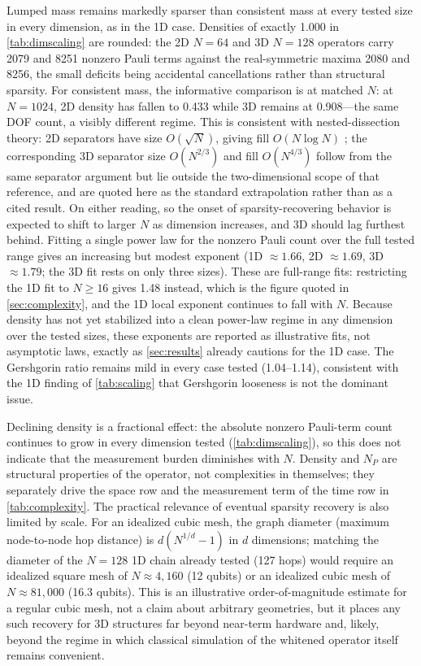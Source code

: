 \documentclass{ieeeaccess}
\begin{document}
Lumped mass remains markedly sparser than consistent mass at every tested size in every dimension, as in the 1D case. Densities of exactly 1.000 in \cref{tab:dimscaling} are rounded: the 2D $N=64$ and 3D $N=128$ operators carry 2079 and 8251 nonzero Pauli terms against the real-symmetric maxima 2080 and 8256, the small deficits being accidental cancellations rather than structural sparsity. For consistent mass, the informative comparison is at matched $N$: at $N=1024$, 2D density has fallen to 0.433 while 3D remains at 0.908---the same DOF count, a visibly different regime. This is consistent with nested-dissection theory: 2D separators have size $O(\sqrt N)$, giving fill $O(N\log N)$ \cite{GeorgeNg1988}; the corresponding 3D separator size $O(N^{2/3})$ and fill $O(N^{4/3})$ follow from the same separator argument but lie outside the two-dimensional scope of that reference, and are quoted here as the standard extrapolation rather than as a cited result. On either reading, so the onset of sparsity-recovering behavior is expected to shift to larger $N$ as dimension increases, and 3D should lag furthest behind. Fitting a single power law for the nonzero Pauli count over the full tested range gives an increasing but modest exponent (1D $\approx\!1.66$, 2D $\approx\!1.69$, 3D $\approx\!1.79$; the 3D fit rests on only three sizes). These are full-range fits: restricting the 1D fit to $N\ge16$ gives 1.48 instead, which is the figure quoted in \cref{sec:complexity}, and the 1D local exponent continues to fall with $N$. Because density has not yet stabilized into a clean power-law regime in any dimension over the tested sizes, these exponents are reported as illustrative fits, not asymptotic laws, exactly as \cref{sec:results} already cautions for the 1D case. The Gershgorin ratio remains mild in every case tested (1.04--1.14), consistent with the 1D finding of \cref{tab:scaling} that Gershgorin looseness is not the dominant issue.

Declining density is a fractional effect: the absolute nonzero Pauli-term count continues to grow in every dimension tested (\cref{tab:dimscaling}), so this does not indicate that the measurement burden diminishes with $N$. Density and $N_P$ are structural properties of the operator, not complexities in themselves; they separately drive the space row and the measurement term of the time row in \cref{tab:complexity}. The practical relevance of eventual sparsity recovery is also limited by scale. For an idealized cubic mesh, the graph diameter (maximum node-to-node hop distance) is $d(N^{1/d}-1)$ in $d$ dimensions; matching the diameter of the $N=128$ 1D chain already tested (127 hops) would require an idealized square mesh of $N\approx4{,}160$ (12 qubits) or an idealized cubic mesh of $N\approx81{,}000$ (16.3 qubits). This is an illustrative order-of-magnitude estimate for a regular cubic mesh, not a claim about arbitrary geometries, but it places any such recovery for 3D structures far beyond near-term hardware and, likely, beyond the regime in which classical simulation of the whitened operator itself remains convenient.
\end{document}
